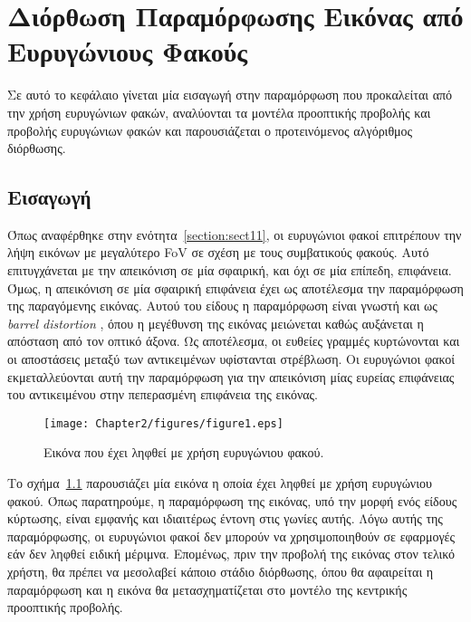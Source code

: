 ﻿\chapter{Διόρθωση Παραμόρφωσης Εικόνας από Ευρυγώνιους Φακούς}
\label{chapter:chap2}

Σε αυτό το κεφάλαιο γίνεται μία εισαγωγή στην παραμόρφωση που προκαλείται από την χρήση ευρυγώνιων φακών, αναλύονται τα μοντέλα προοπτικής προβολής και προβολής ευρυγώνιων φακών και παρουσιάζεται ο προτεινόμενος αλγόριθμος διόρθωσης.

\section{Εισαγωγή}
\label{section:sect21}
\indent
Όπως αναφέρθηκε στην ενότητα~\ref{section:sect11}, οι ευρυγώνιοι φακοί επιτρέπουν την λήψη εικόνων με μεγαλύτερο \ac{FoV} σε σχέση με τους συμβατικούς φακούς. Αυτό επιτυγχάνεται με την απεικόνιση σε μία σφαιρική, και όχι σε μία επίπεδη, επιφάνεια. Όμως, η απεικόνιση σε μία σφαιρική επιφάνεια έχει ως αποτέλεσμα την παραμόρφωση της παραγόμενης εικόνας. Αυτού του είδους η παραμόρφωση είναι γνωστή και ως \textsl{barrel distortion} \cite{imagedistortion}, όπου η μεγέθυνση της εικόνας μειώνεται καθώς αυξάνεται η απόσταση από τον οπτικό άξονα. Ως αποτέλεσμα, οι ευθείες γραμμές κυρτώνονται και οι αποστάσεις μεταξύ των αντικειμένων υφίστανται στρέβλωση. Οι ευρυγώνιοι φακοί εκμεταλλεύονται αυτή την παραμόρφωση για την απεικόνιση μίας ευρείας επιφάνειας του αντικειμένου στην πεπερασμένη επιφάνεια της εικόνας.

\begin{figure}
\centering
\texttt{[image: Chapter2/figures/figure1.eps]}
\caption{Εικόνα που έχει ληφθεί με χρήση ευρυγώνιου φακού.}
\label{figure:fig21}
\end{figure}

\indent
Το σχήμα~\ref{figure:fig21} παρουσιάζει μία εικόνα η οποία έχει ληφθεί με χρήση ευρυγώνιου φακού. Όπως παρατηρούμε, η παραμόρφωση της εικόνας, υπό την μορφή ενός είδους κύρτωσης, είναι εμφανής και ιδιαιτέρως έντονη στις γωνίες αυτής. Λόγω αυτής της παραμόρφωσης, οι ευρυγώνιοι φακοί δεν μπορούν να χρησιμοποιηθούν σε εφαρμογές εάν δεν ληφθεί ειδική μέριμνα. Επομένως, πριν την προβολή της εικόνας στον τελικό χρήστη, θα πρέπει να μεσολαβεί κάποιο στάδιο διόρθωσης, όπου θα αφαιρείται η παραμόρφωση και η εικόνα θα μετασχηματίζεται στο μοντέλο της κεντρικής προοπτικής προβολής.

